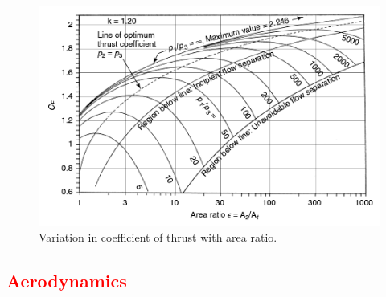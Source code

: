 		
		
		\begin{figure}[ht]
			\centering
			\includegraphics[width=0.7\linewidth]{"figures/3_vehicle_design/Thrust Coefficient - Arat"}
			\caption{Variation in coefficient of thrust with area ratio\cite{RPE}.}
			\label{fig:ThrustCoefficient-Arat}
		\end{figure}

\textcolor{red}{
		\subsection{Aerodynamics}\label{sec:thirdstageaero}
	}
	
